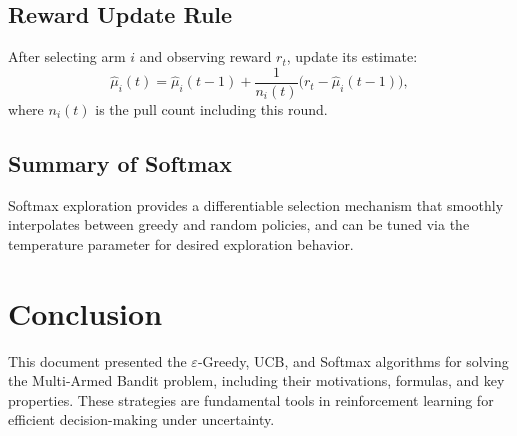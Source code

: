 \documentclass{article}
\begin{document}
\subsection{Reward Update Rule}
After selecting arm $i$ and observing reward $r_t$, update its estimate:
\[
\hat\mu_i(t) = \hat\mu_i(t-1) + \frac{1}{n_i(t)}\bigl(r_t - \hat\mu_i(t-1)\bigr),
\]where $n_i(t)$ is the pull count including this round.

\subsection{Summary of Softmax}
Softmax exploration provides a differentiable selection mechanism that smoothly interpolates between greedy and random policies, and can be tuned via the temperature parameter for desired exploration behavior.

\section{Conclusion}
This document presented the $\varepsilon$-Greedy, UCB, and Softmax algorithms for solving the Multi-Armed Bandit problem, including their motivations, formulas, and key properties. These strategies are fundamental tools in reinforcement learning for efficient decision-making under uncertainty.
\end{document}
